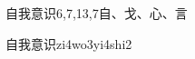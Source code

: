 \begin{entry}{自我意识}{6,7,13,7}{⾃、⼽、⼼、⾔}
  \begin{phonetics}{自我意识}{zi4wo3yi4shi2}
  \end{phonetics}
\end{entry}
